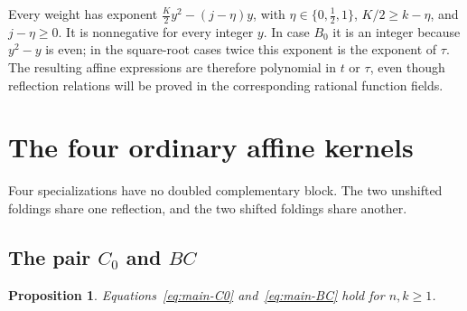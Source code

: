 \documentclass[12pt]{article}
\newtheorem{proposition}[theorem]{Proposition}
\numberwithin{equation}{section}
\begin{document}
Every weight has exponent
$\frac K2y^2-(j-\eta)y$, with
$\eta\in\{0,\tfrac12,1\}$,
$K/2\ge k-\eta$, and $j-\eta\ge0$.
It is nonnegative for every integer $y$.  In case $B_0$ it is an
integer because $y^2-y$ is even; in the square-root cases twice this
exponent is the exponent of $\tau$.  The resulting affine expressions
are therefore polynomial in $t$ or $\tau$, even though reflection
relations will be proved in the corresponding rational function fields.


\section{The four ordinary affine kernels}\label{sec:ordinary}

Four specializations have no doubled complementary block.  The two
unshifted foldings share one reflection, and the two shifted foldings
share another.

\subsection{The pair \texorpdfstring{$C_0$ and $BC$}{C0 and BC}}

\begin{proposition}
Equations~\eqref{eq:main-C0} and~\eqref{eq:main-BC} hold for $n,k\ge1$.
\end{proposition}
\end{document}
